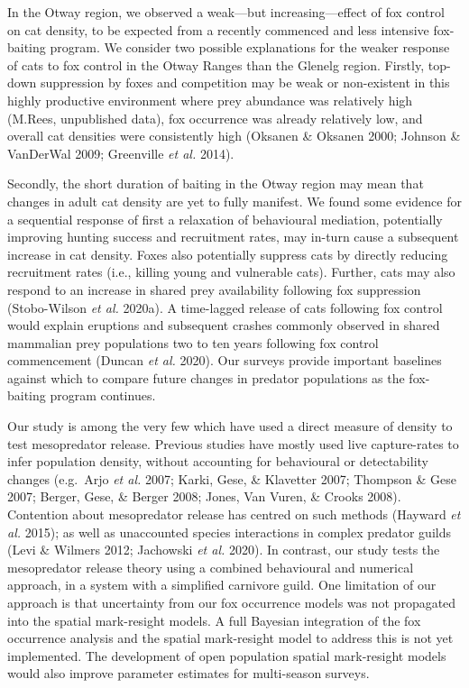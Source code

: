 \documentclass[11pt,a4paper,titlepage,twoside,openright]{style/unimelbthesis}
\begin{document}
\begin{mainmatter}
In the Otway region, we observed a weak---but increasing---effect of fox control on cat density, to be expected from a recently commenced and less intensive fox-baiting program. We consider two possible explanations for the weaker response of cats to fox control in the Otway Ranges than the Glenelg region. Firstly, top-down suppression by foxes and competition may be weak or non-existent in this highly productive environment where prey abundance was relatively high (M.Rees, unpublished data), fox occurrence was already relatively low, and overall cat densities were consistently high (Oksanen \& Oksanen 2000; Johnson \& VanDerWal 2009; Greenville \emph{et al.} 2014).

Secondly, the short duration of baiting in the Otway region may mean that changes in adult cat density are yet to fully manifest. We found some evidence for a sequential response of first a relaxation of behavioural mediation, potentially improving hunting success and recruitment rates, may in-turn cause a subsequent increase in cat density. Foxes also potentially suppress cats by directly reducing recruitment rates (i.e., killing young and vulnerable cats). Further, cats may also respond to an increase in shared prey availability following fox suppression (Stobo-Wilson \emph{et al.} 2020a). A time-lagged release of cats following fox control would explain eruptions and subsequent crashes commonly observed in shared mammalian prey populations two to ten years following fox control commencement (Duncan \emph{et al.} 2020). Our surveys provide important baselines against which to compare future changes in predator populations as the fox-baiting program continues.

Our study is among the very few which have used a direct measure of density to test mesopredator release. Previous studies have mostly used live capture-rates to infer population density, without accounting for behavioural or detectability changes (e.g.~Arjo \emph{et al.} 2007; Karki, Gese, \& Klavetter 2007; Thompson \& Gese 2007; Berger, Gese, \& Berger 2008; Jones, Van Vuren, \& Crooks 2008). Contention about mesopredator release has centred on such methods (Hayward \emph{et al.} 2015); as well as unaccounted species interactions in complex predator guilds (Levi \& Wilmers 2012; Jachowski \emph{et al.} 2020). In contrast, our study tests the mesopredator release theory using a combined behavioural and numerical approach, in a system with a simplified carnivore guild. One limitation of our approach is that uncertainty from our fox occurrence models was not propagated into the spatial mark-resight models. A full Bayesian integration of the fox occurrence analysis and the spatial mark-resight model to address this is not yet implemented. The development of open population spatial mark-resight models would also improve parameter estimates for multi-season surveys.


\end{mainmatter}
\end{document}
